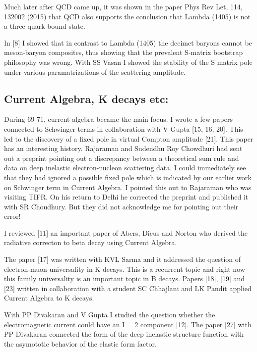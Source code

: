 Much later after QCD came up, it was shown in the paper Phys Rev Let, 
114, 132002 (2015) that QCD also supports the conclusion that Lambda 
(1405) is not a three-quark bound state.

In [8] I showed that in contrast to Lambda (1405) the decimet baryons 
cannot be meson-baryon composites, thus showing that the prevalent 
S-matrix bootstrap philosophy was wrong. With SS Vasan I showed the 
stability of the S matrix pole under various paramatrizations of the 
scattering amplitude.

\vspace{-\topsep}
\subsection*{Current Algebra, K decays etc:}

During 69-71, current algebra became the main focus. I wrote a few 
papers connected to Schwinger terms in collaboration with V Gupta 
[15, 16, 20]. This led to the discovery of a fixed pole in virtual Compton 
amplitude [21]. This paper has an interesting history. Rajaraman and 
Sudendhu Roy Chowdhuri had sent out a preprint pointing out a 
discrepancy between a theoretical sum rule and data on deep inelastic 
electron-nucleon scattering data. I could immediately see that they had 
ignored a possible fixed pole which is indicated by our earlier work on 
Schwinger term in Current Algebra. I pointed this out to Rajaraman who 
was visi\-ting TIFR. On his return to Delhi he corrected the preprint and 
published it with SR Choudhury. But they did not acknowledge me for 
pointing out their error!

I reviewed [11] an important paper of Abers, Dicus and Norton who 
derived the radiative correcton to beta decay using Current Algebra.

The paper [17] was written with KVL Sarma and it addressed the question 
of electron-muon universality in K decays. This is a recurrent topic and 
right now this family universality is an impo\-rtant topic in B decays. 
Papers [18], [19] and [23] written in collaboration with a student SC 
Chhajlani and LK Pandit appli\-ed Current Algebra to K decays.

With PP Divakaran and V Gupta I studied the question whe\-ther the 
electromagnetic current could have an I = 2 compo\-nent [12]. The paper 
[27] with PP Divakaran connected the form of the deep inelastic 
structure function with the asymototic behavior of the elastic form 
factor.

